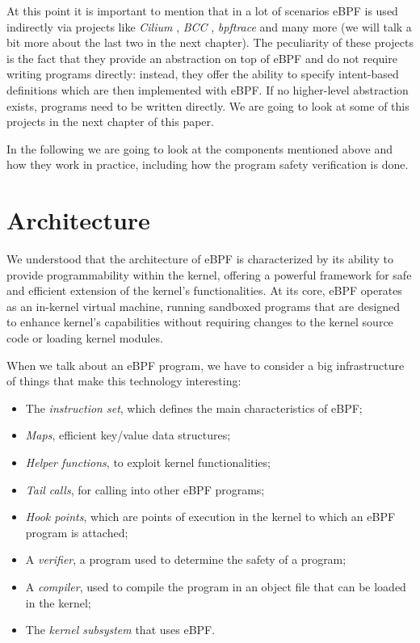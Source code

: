 At this point it is important to mention that in a lot of scenarios eBPF is used indirectly via projects like \textit{Cilium} \cite{CiliumWebsite}, \textit{BCC} \cite{BCCRepo}, \textit{bpftrace} \cite{bpftraceRepo} and many more (we will talk a bit more about the last two in the next chapter). 
The peculiarity of these projects is the fact that they provide an abstraction on top of eBPF and do not require writing programs directly: instead, they offer the ability to specify intent-based definitions which are then implemented with eBPF.
If no higher-level abstraction exists, programs need to be written directly. 
We are going to look at some of this projects in the next chapter of this paper.

In the following we are going to look at the components mentioned above and how they work in practice, including how the program safety verification is done.

\section{Architecture}

We understood that the architecture of eBPF is characterized by its ability to provide programmability within the kernel, offering a powerful framework for safe and efficient extension of the kernel's functionalities. 
At its core, eBPF operates as an in-kernel virtual machine, running sandboxed programs that are designed to enhance kernel's capabilities without requiring changes to the kernel source code or loading kernel modules.

When we talk about an eBPF program, we have to consider a big infrastructure of things that make this technology interesting:

\begin{itemize}
	\item 
		The \textit{instruction set}, which defines the main characteristics of eBPF;
	\item 
		\textit{Maps}, efficient key/value data structures;
	\item 
		\textit{Helper functions}, to exploit kernel functionalities;
	\item 
		\textit{Tail calls}, for calling into other eBPF programs;
	\item 
		\textit{Hook points}, which are points of execution in the kernel to which an eBPF program is attached;
	\item 
		A \textit{verifier}, a program used to determine the safety of a program;
	\item 
		A \textit{compiler}, used to compile the program in an object file that can be loaded in the kernel; 
	\item 
		The \textit{kernel subsystem} that uses eBPF.
\end{itemize}

